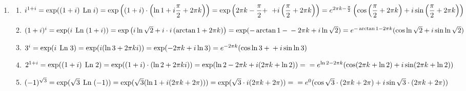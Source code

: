 \documentclass[a4paper,12pt]{article}
\newcommand{\Ln}[0]{\textrm{\hspace*{0.15cm}Ln\hspace*{0.1cm}}}
\begin{document}
\begin{justify}
\begin{enumerate}
\begin{enumerate}
 			\end{enumerate}
 			\item \begin{enumerate}
 				\item $i^{1+i}=\exp((1+i)\Ln i)=\exp\left((1+i)\cdot\left(\ln 1+i\dfrac\pi2+2\pi k\right)\right)=\exp\left(2\pi k-\dfrac\pi2+\right.\\\left.+i\left(\dfrac\pi2+2\pi k\right)\right)=e^{2\pi k-\frac\pi2}\left(\cos\left(\dfrac\pi2+2\pi k\right)+i\sin\left(\dfrac\pi2+2\pi k\right)\right)$
 				\item $(1+i)^i=\exp(i\Ln(1+i))=\exp\left(i\ln\sqrt2+i\cdot i\left(\arctan1+2\pi k\right)\right)=\exp(-\arctan1-\\-2\pi k+i\ln\sqrt2)=e^{-\arctan1-2\pi k}(\cos\ln\sqrt2+i\sin \ln\sqrt2)$
 				\item $3^i=\exp(i\Ln3)=\exp(i(\ln3+2\pi ki))=\exp(-2\pi k+i\ln3)=e^{-2\pi k}(\cos\ln3+\\+i\sin\ln3)$
 				\item $2^{1+i}=\exp((1+i)\Ln2)=\exp((1+i)\cdot(\ln2+2\pi ki))=\exp(\ln2-2\pi k+i(2\pi k+\ln2))=\\=e^{\ln2-2\pi k}(\cos(2\pi k+\ln2)+i\sin(2\pi k+\ln2))$
 				\item $(-1)^{\sqrt3}=\exp(\sqrt3\Ln(-1))=\exp(\sqrt3(\ln1+i(2\pi k+2\pi)))=\exp(\sqrt3\cdot i(2\pi k+2\pi))=\\=e^0(\cos\sqrt3\cdot(2\pi k+2\pi)+i\sin\sqrt3\cdot(2\pi k+2\pi))$
 			\end{enumerate}
 		\end{enumerate}
	\end{justify}
\end{document}
